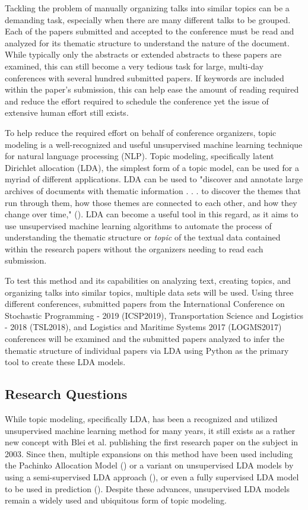 \documentclass[a4paper, 12pt, twoside]{article}
\numberwithin{equation}{section} %
\begin{document}
Tackling the problem of manually organizing talks into similar topics can be a demanding task, especially when there are many different talks to be grouped. Each of the papers submitted and accepted to the conference must be read and analyzed for its thematic structure to understand the nature of the document. While typically only the abstracts or extended abstracts to these papers are examined, this can still become a very tedious task for large, multi-day conferences with several hundred submitted papers. If keywords are included within the paper's submission, this can help ease the amount of reading required and reduce the effort required to schedule the conference yet the issue of extensive human effort still exists. 

To help reduce the required effort on behalf of conference organizers, topic modeling is a well-recognized and useful unsupervised machine learning technique for natural language processing (NLP). Topic modeling, specifically latent Dirichlet allocation (LDA), the simplest form of a topic model, can be used for a myriad of different applications. LDA can be used to "discover and annotate large archives of documents with thematic information . . . to discover the themes that run through them, how those themes are connected to each other, and how they change over time," (\cite{blei2012}). LDA can become a useful tool in this regard, as it aims to use unsupervised machine learning algorithms to automate the process of understanding the thematic structure or \textit{topic} of the textual data contained within the research papers without the organizers needing to read each submission.

To test this method and its capabilities on analyzing text, creating topics, and organizing talks into similar topics, multiple data sets will be used. Using three different conferences, submitted papers from the International Conference on Stochastic Programming - 2019 (ICSP2019), Transportation Science and Logistics - 2018 (TSL2018)\nocite{TSL}\nocite{LOGMS}\nocite{ICSP}, and Logistics and Maritime Systems 2017 (LOGMS2017) conferences will be examined and the submitted papers analyzed to infer the thematic structure of individual papers via LDA using Python as the primary tool to create these LDA models.

\subsection{Research Questions}

While topic modeling, specifically LDA, has been a recognized and utilized unsupervised machine learning method for many years, it still exists as a rather new concept with Blei et al. publishing the first research paper on the subject in 2003. Since then, multiple expansions on this method have been used including the Pachinko Allocation Model (\cite{Li2006}) or a variant on unsupervised LDA models by using a semi-supervised LDA approach (\cite{Ramage2010}), or even a fully supervised LDA model to be used in prediction (\cite{blei2010}). Despite these advances, unsupervised LDA models remain a widely used and ubiquitous form of topic modeling. 
\end{document}
